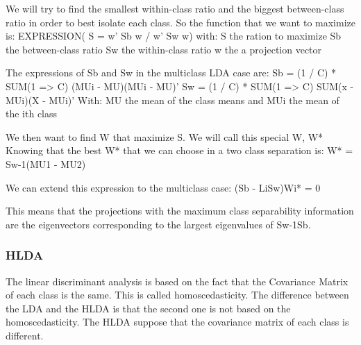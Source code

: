 We will try to find the smallest within-class ratio and the biggest between-class ratio in order to best
isolate each class.
So the function that we want to maximize is:
EXPRESSION( S = w' Sb w / w' Sw w)
with:
S the ration to maximize
Sb the between-class ratio
Sw the within-class ratio
w the a projection vector 

The expressions of Sb and Sw in the multiclass LDA case are:
Sb = (1 / C) * SUM(1 => C) (MUi - MU)(MUi - MU)'
Sw = (1 / C) * SUM(1 => C) SUM(x - MUi)(X - MUi)'
With:
MU the mean of the class means
and MUi the mean of the ith class

We then want to find W that maximize S.
We will call this special W, W*
Knowing that the best W* that we can choose in a two class separation is:
W* = Sw-1(MU1 - MU2)

We can extend this expression to the multiclass case:
(Sb - LiSw)Wi* = 0

This means that the projections with the maximum class separability information are
the eigenvectors corresponding to the largest eigenvalues of Sw-1Sb.

\subsubsection{HLDA}

The linear discriminant analysis is based on the fact that the Covariance Matrix of
each class is the same. This is called homoscedasticity.
The difference between the LDA and the HLDA is that the second one is not based on the
homoscedasticity.
The HLDA suppose that the covariance matrix of each class is different.
